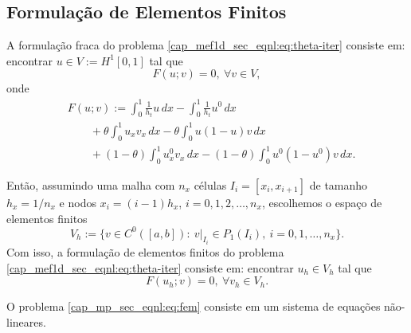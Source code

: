 \subsection{Formulação de Elementos Finitos}
\badgeRevisar

A formulação fraca do problema \eqref{cap_mef1d_sec_eqnl:eq:theta-iter} consiste em: encontrar $u\in V := H^1[0,1]$ tal que
\begin{equation}
  F(u;v) = 0, ~\forall v\in V,
\end{equation}
onde
\begin{equation}
  \begin{aligned}
    & F(u; v) := \int_0^1 \frac{1}{h_t}u\,dx - \int_0^1 \frac{1}{h_t}u^0\,dx\\
    &\qquad + \theta\int_0^1 u_xv_x\,dx - \theta\int_0^1 u(1-u)v\,dx\\
    &\qquad + (1-\theta)\int_0^1 u^0_x v_x\,dx - (1-\theta)\int_0^1 u^0(1-u^0)v\,dx.
  \end{aligned}
\end{equation}

Então, assumindo uma malha com $n_x$ células $I_i = [x_i, x_{i+1}]$ de tamanho $h_x = 1/n_x$ e nodos $x_i = (i-1)h_x$, $i = 0, 1, 2, \dotsc, n_x$, escolhemos o espaço de elementos finitos
\begin{equation}
  V_h := \{v\in C^0([a,b]): ~v|_{I_i}\in P_1(I_i), ~i=0,1,\dotsc,n_x\}.
\end{equation}
Com isso, a formulação de elementos finitos do problema \eqref{cap_mef1d_sec_eqnl:eq:theta-iter} consiste em: encontrar $u_h\in V_h$ tal que
\begin{equation}\label{cap_mp_sec_eqnl:eq:fem}
  F(u_h; v) = 0, ~\forall v_h\in V_h.
\end{equation}

\begin{obs}
  O problema \eqref{cap_mp_sec_eqnl:eq:fem} consiste em um sistema de equações não-lineares.
\end{obs}

